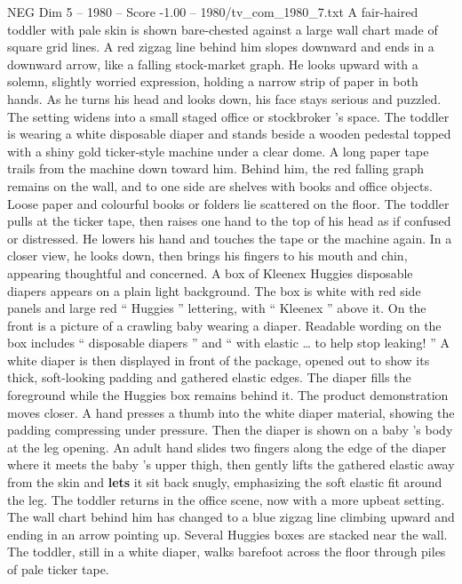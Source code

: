 \begin{textsample}{NEG Dim 5 – 1980 – Score -1.00 – 1980/tv\_com\_1980\_7.txt}  \label{ex:f5_neg_070}
A fair-haired toddler with pale skin is shown bare-chested against a large wall chart made of square grid lines.
A red zigzag line behind him slopes downward and ends in a downward arrow, like a falling stock-market graph.
He looks upward with a solemn, slightly worried expression, holding a narrow strip of paper in both hands.
As he turns his head and looks down, his face stays serious and puzzled.
The setting widens into a small staged office or stockbroker ’s space.
The toddler is wearing a white disposable diaper and stands beside a wooden pedestal topped with a shiny gold ticker-style machine under a clear dome.
A long paper tape trails from the machine down toward him.
Behind him, the red falling graph remains on the wall, and to one side are shelves with books and office objects.
Loose paper and colourful books or folders lie scattered on the floor.
The toddler pulls at the ticker tape, then raises one hand to the top of his head as if confused or distressed.
He lowers his hand and touches the tape or the machine again.
In a closer view, he looks down, then brings his fingers to his mouth and chin, appearing thoughtful and concerned.
A box of Kleenex Huggies disposable diapers appears on a plain light background.
The box is white with red side panels and large red “ Huggies ” lettering, with “ Kleenex ” above it.
On the front is a picture of a crawling baby wearing a diaper.
Readable wording on the box includes “ disposable diapers ” and “ with elastic … to help stop leaking! ” A white diaper is then displayed in front of the package, opened out to show its thick, soft-looking padding and gathered elastic edges.
The diaper fills the foreground while the Huggies box remains behind it.
The product demonstration moves closer.
A hand presses a thumb into the white diaper material, showing the padding compressing under pressure.
Then the diaper is shown on a baby ’s body at the leg opening.
An adult hand slides two fingers along the edge of the diaper where it meets the baby ’s upper thigh, then gently lifts the gathered elastic away from the skin and \textbf{lets} it sit back snugly, emphasizing the soft elastic fit around the leg.
The toddler returns in the office scene, now with a more upbeat setting.
The wall chart behind him has changed to a blue zigzag line climbing upward and ending in an arrow pointing up.
Several Huggies boxes are stacked near the wall.
The toddler, still in a white diaper, walks barefoot across the floor through piles of pale ticker tape.

\end{textsample}
